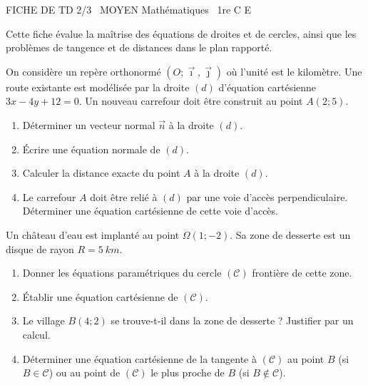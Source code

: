 \documentclass[11pt]{article}
\begin{document}
\begin{tcolorbox}[enhanced,colback=popink,colframe=popink,arc=10pt,boxrule=0pt,left=12pt,right=12pt,top=9pt,bottom=9pt]
{\color{white}\popxbold\small FICHE DE TD 2/3 \textbullet\ MOYEN \hfill Mathématiques \textbullet\ 1re C E\par}
\end{tcolorbox}
\vspace{4pt}
Cette fiche évalue la maîtrise des équations de droites et de cercles, ainsi que les problèmes de tangence et de distances dans le plan rapporté.

\begin{exercice}
On considère un repère orthonormé $(O;\vec{\imath},\vec{\jmath})$ où l'unité est le kilomètre. 
Une route existante est modélisée par la droite $(d)$ d'équation cartésienne $3x - 4y + 12 = 0$. 
Un nouveau carrefour doit être construit au point $A(2; 5)$.
\begin{enumerate}
    \item Déterminer un vecteur normal $\vec{n}$ à la droite $(d)$.
    \item Écrire une équation normale de $(d)$.
    \item Calculer la distance exacte du point $A$ à la droite $(d)$. 
    \item Le carrefour $A$ doit être relié à $(d)$ par une voie d'accès perpendiculaire. 
    Déterminer une équation cartésienne de cette voie d'accès.
\end{enumerate}
\end{exercice}

\begin{exercice}
Un château d'eau est implanté au point $\Omega(1; -2)$. Sa zone de desserte est un disque de rayon $R = \SI{5}{km}$.
\begin{enumerate}
    \item Donner les équations paramétriques du cercle $(\mathcal{C})$ frontière de cette zone.
    \item Établir une équation cartésienne de $(\mathcal{C})$.
    \item Le village $B(4; 2)$ se trouve-t-il dans la zone de desserte ? Justifier par un calcul.
    \item Déterminer une équation cartésienne de la tangente à $(\mathcal{C})$ au point $B$ (si $B \in \mathcal{C}$) ou au point de $(\mathcal{C})$ le plus proche de $B$ (si $B \notin \mathcal{C}$).
\end{enumerate}
\end{exercice}
\end{document}
